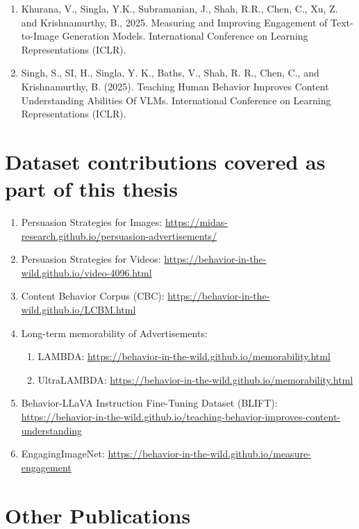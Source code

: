 \begin{enumerate}
    \item Khurana, V., Singla, Y.K., Subramanian, J., Shah, R.R., Chen, C., Xu, Z. and Krishnamurthy, B., 2025. Measuring and Improving Engagement of Text-to-Image Generation Models. International Conference on Learning Representations (ICLR).

    \item Singh, S., SI, H., Singla, Y. K., Baths, V., Shah, R. R., Chen, C., and Krishnamurthy, B. (2025). Teaching Human Behavior Improves Content Understanding Abilities Of VLMs. International Conference on Learning Representations (ICLR).

\end{enumerate}


\chapter*{Dataset contributions covered as part of this thesis}

\begin{enumerate}
    \item Persuasion Strategies for Images: \url{https://midas-research.github.io/persuasion-advertisements/}
    \item Persuasion Strategies for Videos: \url{https://behavior-in-the-wild.github.io/video-4096.html}
    \item Content Behavior Corpus (CBC): \url{https://behavior-in-the-wild.github.io/LCBM.html}
    \item Long-term memorability of Advertisements:
    \begin{enumerate}
        \item LAMBDA: \url{https://behavior-in-the-wild.github.io/memorability.html}
        \item UltraLAMBDA: \url{https://behavior-in-the-wild.github.io/memorability.html}
    \end{enumerate}
    \item Behavior-LLaVA Instruction Fine-Tuning Dataset (BLIFT): \url{https://behavior-in-the-wild.github.io/teaching-behavior-improves-content-understanding}
    \item EngagingImageNet: \url{https://behavior-in-the-wild.github.io/measure-engagement}
\end{enumerate}




\chapter*{Other Publications}

